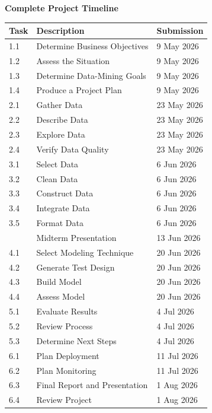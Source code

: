 \medskip\noindent
\textbf{Complete Project Timeline}

{\renewcommand{\arraystretch}{0.75}
\begin{center}
\begin{tabular}{lp{6.5cm}l}
\hline
\textbf{Task} & \textbf{Description} & \textbf{Submission} \\
\hline
1.1 & Determine Business Objectives  & 9 May 2026  \\
1.2 & Assess the Situation           & 9 May 2026  \\
1.3 & Determine Data-Mining Goals    & 9 May 2026  \\
1.4 & Produce a Project Plan         & 9 May 2026  \\
\hline
2.1 & Gather Data                    & 23 May 2026 \\
2.2 & Describe Data                  & 23 May 2026 \\
2.3 & Explore Data                   & 23 May 2026 \\
2.4 & Verify Data Quality            & 23 May 2026 \\
\hline
3.1 & Select Data                    & 6 Jun 2026  \\
3.2 & Clean Data                     & 6 Jun 2026  \\
3.3 & Construct Data                 & 6 Jun 2026  \\
3.4 & Integrate Data                 & 6 Jun 2026  \\
3.5 & Format Data                    & 6 Jun 2026  \\
\hline
    & Midterm Presentation           & 13 Jun 2026 \\
\hline
4.1 & Select Modeling Technique      & 20 Jun 2026 \\
4.2 & Generate Test Design           & 20 Jun 2026 \\
4.3 & Build Model                    & 20 Jun 2026 \\
4.4 & Assess Model                   & 20 Jun 2026 \\
\hline
5.1 & Evaluate Results               & 4 Jul 2026  \\
5.2 & Review Process                 & 4 Jul 2026  \\
5.3 & Determine Next Steps           & 4 Jul 2026  \\
\hline
6.1 & Plan Deployment                & 11 Jul 2026 \\
6.2 & Plan Monitoring                & 11 Jul 2026 \\
6.3 & Final Report and Presentation  & 1 Aug 2026  \\
6.4 & Review Project                 & 1 Aug 2026  \\
\hline
\end{tabular}
\end{center}}%
